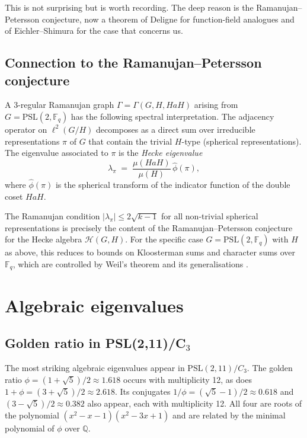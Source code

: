 \documentclass[11pt,a4paper]{amsart}
\theoremstyle{definition}
\theoremstyle{remark}
\newcommand{\PSL}[1]{\mathrm{PSL}(2,\mathbb{F}_{#1})}
\newcommand{\Q}{\mathbb{Q}}
\newcommand{\F}{\mathbb{F}}
\begin{document}
This is not surprising but is worth recording.  The deep reason is the
Ramanujan--Petersson conjecture, now a theorem of Deligne \cite{Deligne1974}
for function-field analogues and of Eichler--Shimura for the case that
concerns us.

\subsection{Connection to the Ramanujan--Petersson conjecture}

A 3-regular Ramanujan graph $\Gamma = \Gamma(G,H,HaH)$ arising from
$G = \PSL{q}$ has the following spectral interpretation.  The adjacency
operator on $\ell^2(G/H)$ decomposes as a direct sum over irreducible
representations $\pi$ of $G$ that contain the trivial $H$-type (spherical
representations).  The eigenvalue associated to $\pi$ is the \emph{Hecke
eigenvalue}
\[
  \lambda_\pi \;=\; \frac{\mu(HaH)}{\mu(H)}\,\hat{\phi}(\pi),
\]
where $\hat\phi(\pi)$ is the spherical transform of the indicator function of
the double coset $HaH$.

The Ramanujan condition $|\lambda_\pi| \leq 2\sqrt{k-1}$ for all non-trivial
spherical representations is precisely the content of the
Ramanujan--Petersson conjecture for the Hecke algebra $\mathcal{H}(G,H)$.
For the specific case $G = \PSL{q}$ with $H$ as above, this reduces to
bounds on Kloosterman sums and character sums over $\F_q$, which are
controlled by Weil's theorem and its generalisations \cite{Weil1948}.

\section{Algebraic eigenvalues}\label{sec:alg}

\subsection{Golden ratio in PSL(2,11)/C$_3$}

The most striking algebraic eigenvalues appear in $\mathrm{PSL}(2,11)/C_3$.
The golden ratio $\phi = (1+\sqrt{5})/2 \approx 1.618$ occurs with multiplicity
12, as does $1+\phi = (3+\sqrt{5})/2 \approx 2.618$.  Its conjugates
$1/\phi = (\sqrt{5}-1)/2 \approx 0.618$ and $(3-\sqrt{5})/2 \approx 0.382$
also appear, each with multiplicity 12.  All four are roots of the polynomial
$(x^2-x-1)(x^2-3x+1)$ and are related by the minimal polynomial of
$\phi$ over $\Q$.
\end{document}
